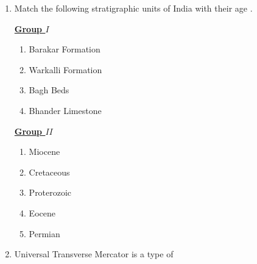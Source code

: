\documentclass[journal,12pt,onecolumn]{IEEEtran}
\theoremstyle{remark}
\begin{document}
\begin{enumerate}
    \item Match the following stratigraphic units of India  with their age . \hfill{}
        \begin{multicols}{2}
            \underline{\textbf{Group $I$}}
            \begin{enumerate}[start=16]
                \item Barakar Formation
                \item Warkalli  Formation
                \item Bagh Beds
                \item Bhander Limestone
            \end{enumerate}
            
            \columnbreak
            
            \underline{\textbf{Group $II$}}
            \begin{enumerate}
                \item Miocene
                \item Cretaceous
                \item Proterozoic
                \item Eocene
                \item Permian
            \end{enumerate}
        \end{multicols}
        \begin{enumerate} 
        \end{enumerate}    
    
    \item Universal Transverse Mercator  is a type of \hfill{}
        \begin{enumerate} 
        \end{enumerate}    
    

\end{enumerate}
\end{document}
